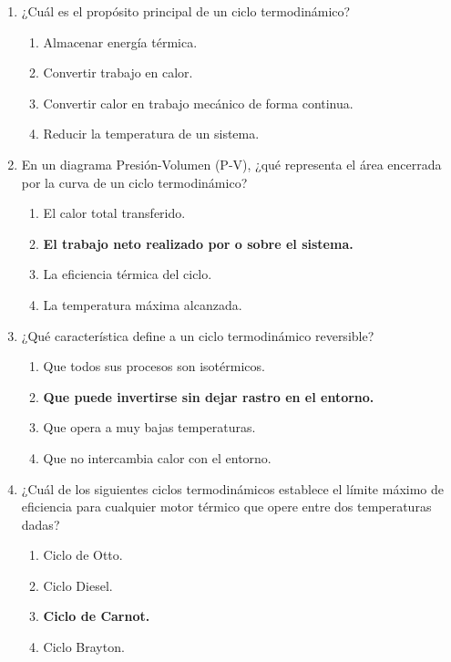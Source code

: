\documentclass{article}
\begin{document}
\begin{enumerate}[label=\arabic*.]

    \item ¿Cuál es el propósito principal de un ciclo termodinámico?
    \begin{enumerate}[label=\alph*)]
        \item Almacenar energía térmica.
        \item Convertir trabajo en calor.
        \item Convertir calor en trabajo mecánico de forma continua.
        \item Reducir la temperatura de un sistema.
    \end{enumerate}

    \item En un diagrama Presión-Volumen (P-V), ¿qué representa el área encerrada por la curva de un ciclo termodinámico?
    \begin{enumerate}[label=\alph*)]
        \item El calor total transferido.
        \item \textbf{El trabajo neto realizado por o sobre el sistema.}
        \item La eficiencia térmica del ciclo.
        \item La temperatura máxima alcanzada.
    \end{enumerate}

    \item ¿Qué característica define a un ciclo termodinámico reversible?
    \begin{enumerate}[label=\alph*)]
        \item Que todos sus procesos son isotérmicos.
        \item \textbf{Que puede invertirse sin dejar rastro en el entorno.}
        \item Que opera a muy bajas temperaturas.
        \item Que no intercambia calor con el entorno.
    \end{enumerate}

    \item ¿Cuál de los siguientes ciclos termodinámicos establece el límite máximo de eficiencia para cualquier motor térmico que opere entre dos temperaturas dadas?
    \begin{enumerate}[label=\alph*)]
        \item Ciclo de Otto.
        \item Ciclo Diesel.
        \item \textbf{Ciclo de Carnot.}
        \item Ciclo Brayton.
    \end{enumerate}


\end{enumerate}
\end{document}
